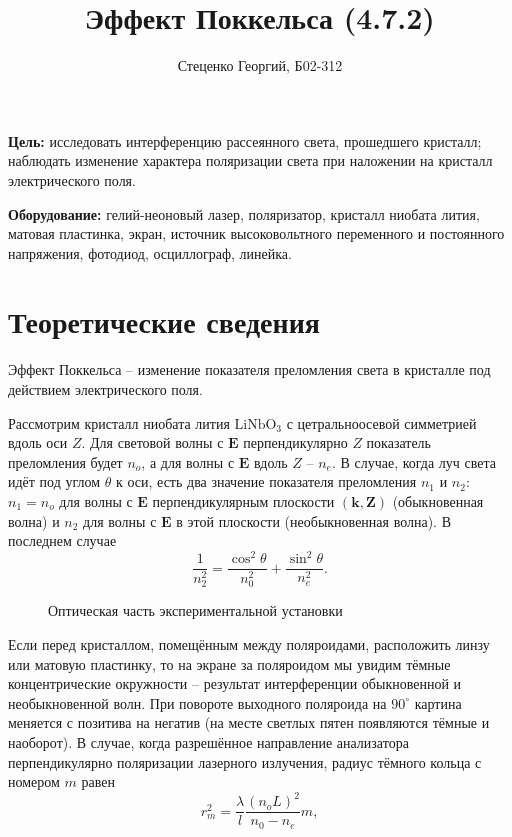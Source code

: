 \documentclass[12pt, a4paper]{article}
\title{Эффект Поккельса (4.7.2)}
\author{Стеценко Георгий, Б02-312}
\date{}
\begin{document}
\maketitle

\textbf{Цель:} исследовать интерференцию рассеянного света, прошедшего
кристалл; наблюдать изменение характера поляризации света при наложении на
кристалл электрического поля.

\textbf{Оборудование:} гелий-неоновый лазер, поляризатор, кристалл ниобата
лития, матовая пластинка, экран, источник высоковольтного переменного и
постоянного напряжения, фотодиод, осциллограф, линейка.

\section{Теоретические сведения}
Эффект Поккельса -- изменение показателя преломления света в кристалле под
действием электрического поля.

Рассмотрим кристалл ниобата лития $\text{LiNbO}_3$ с цетральноосевой симметрией
вдоль оси $Z$. Для световой волны с $\mathbf{E}$ перпендикулярно $Z$ показатель
преломления будет $n_o$, а для волны с $\mathbf{E}$ вдоль $Z$ -- $n_e$. В
случае, когда луч света идёт под углом $\theta$ к оси, есть два значение
показателя преломления $n_1$ и $n_2$: $n_1 = n_o$ для волны с $\mathbf{E}$
перпендикулярным плоскости $(\mathbf{k},\mathbf{Z})$ (обыкновенная волна) и
$n_2$ для волны с $\mathbf{E}$ в этой плоскости (необыкновенная волна). В
последнем случае
\begin{equation}
    \dfrac{1}{n_2^2}=\dfrac{\cos^2 \theta}{n_0^2}+\dfrac{\sin^2 \theta}{n_e^2}.
\end{equation}

\begin{figure}[h]
    \caption{\centering Оптическая часть экспериментальной установки}
    \label{fig:setup}
\end{figure}

Если перед кристаллом, помещённым между поляроидами, расположить линзу или
матовую пластинку, то на экране за поляроидом мы увидим тёмные концентрические
окружности -- результат интерференции обыкновенной и необыкновенной волн. При
повороте выходного поляроида на $90^\circ$ картина меняется с позитива на
негатив (на месте светлых пятен появляются тёмные и наоборот). В случае, когда
разрешённое направление анализатора перпендикулярно поляризации лазерного
излучения, радиус тёмного кольца с номером $m$ равен
\begin{equation}
    r_m^2 = \dfrac{\lambda}{l} \dfrac{(n_oL)^2}{n_0 - n_e}m,
    \label{eq:radius}
\end{equation}
\end{document}
